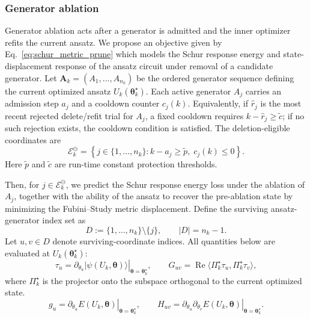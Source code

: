 \documentclass[
  reprint,
  amsmath,
  amssymb,
  aps,
  pra,
  nofootinbib,
  superscriptaddress,
  floatfix
]{revtex4-2}
\newcommand{\ket}[1]{|#1\rangle}
\begin{document}
\subsubsection{Generator ablation}
Generator ablation acts after a generator is admitted and the inner optimizer
refits the current ansatz. We propose an objective given by
Eq.~\eqref{eq:schur_metric_prune} which models the Schur response energy and
state-displacement response of the ansatz circuit under removal of a candidate
generator. Let \(\mathbf A_k=(A_1,\ldots,A_{n_k})\) be the ordered generator
sequence defining the current optimized ansatz \(U_k(\boldsymbol\theta_k^\star)\).
Each active generator \(A_j\) carries an admission step \(a_j\) and a cooldown
counter \(c_j(k)\). Equivalently, if \(\hat r_j\) is the most recent rejected
delete/refit trial for \(A_j\), a fixed cooldown requires
\(k-\hat r_j\ge\tilde c\); if no such rejection exists, the cooldown condition
is satisfied. The deletion-eligible coordinates are
\begin{equation*}
\mathcal E_k^\ominus
=
\left\{
j\in\{1,\ldots,n_k\}
:
k-a_j\ge \tilde p,\;
c_j(k)\le0
\right\}.
\end{equation*}
Here \(\tilde p\) and \(\tilde c\) are run-time constant protection thresholds.

Then, for \(j\in\mathcal E_k^\ominus\), we predict the Schur response energy
loss under the ablation of \(A_j\), together with the ability of the ansatz to
recover the pre-ablation state by minimizing the Fubini--Study metric
displacement. Define the surviving ansatz-generator index set as
\[
D:=\{1,\ldots,n_k\}\setminus\{j\},
\qquad
|D|=n_k-1 .
\]
Let \(u,v\in D\) denote surviving-coordinate indices. All quantities below are
evaluated at \(U_k(\boldsymbol\theta_k^\star)\):
\[
\tau_u
=
\left.
\partial_{\theta_u}\ket{\psi(U_k,\boldsymbol\theta)}
\right|_{\boldsymbol\theta=\boldsymbol\theta_k^\star},
\qquad
G_{uv}
=
\operatorname{Re}\langle \Pi_k^\star\tau_u,\Pi_k^\star\tau_v\rangle,
\]
where \(\Pi_k^\star\) is the projector onto the subspace orthogonal to the current optimized state.
\[
g_u
=
\left.
\partial_{\theta_u}E(U_k,\boldsymbol\theta)
\right|_{\boldsymbol\theta=\boldsymbol\theta_k^\star},
\qquad
H_{uv}
=
\left.
\partial_{\theta_u}\partial_{\theta_v}E(U_k,\boldsymbol\theta)
\right|_{\boldsymbol\theta=\boldsymbol\theta_k^\star}.
\]
\end{document}
